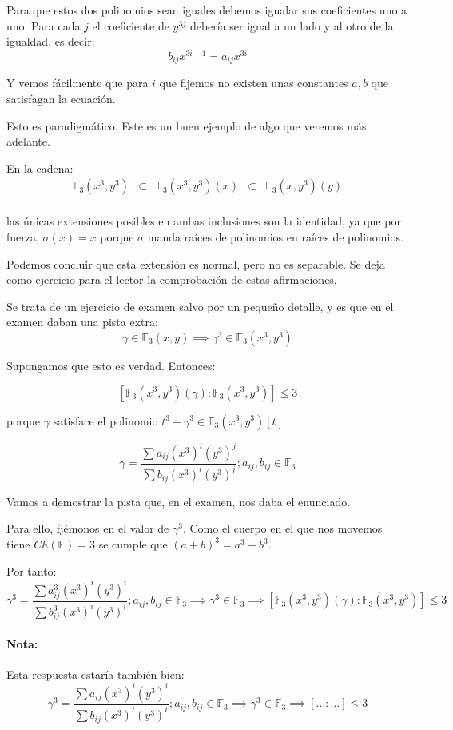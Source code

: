 \begin{problem}[3]
Para que estos dos polinomios sean iguales debemos igualar sus coeficientes uno a uno. Para cada $j$ el coeficiente de $y^{3j}$ debería ser igual a un lado y al otro de la igualdad, es decir:
\[b_{ij}x^{3i+1}=a_{ij}x^{3i}\]

Y vemos fácilmente que para $i$ que fijemos no existen unas constantes $a,b$ que satisfagan la ecuación.

\spart Esto es paradigmático. Este es un buen ejemplo de algo que veremos más adelante.

En la cadena:
$$\begin{array}{ccccc}\mathbb{F}_3(x^3,y^3) &\subset& \mathbb{F}_3(x^3,y^3)(x) &\subset& \mathbb{F}_3(x,y^3)(y)\\
\end{array}$$

las únicas extensiones posibles en ambas inclusiones son la identidad, ya que por fuerza, $σ(x) = x$ porque $σ$ manda raíces de polinomios en raíces de polinomios.

Podemos concluir que esta extensión es normal, pero no es separable. Se deja como ejercicio para el lector la comprobación de estas afirmaciones.

\spart Se trata de un ejercicio de examen salvo por un pequeño detalle, y es que en el examen daban una pista extra:
\[γ∈\mathbb{F}_3(x,y) \implies γ^3 ∈\mathbb{F}_3(x^3,y^3)\]

Supongamos que esto es verdad. Entonces:

\[[\mathbb{F}_3(x^3,y^3)(γ) : \mathbb{F}_3(x^3,y^3)] ≤ 3\]

porque $γ$ satisface el polinomio $t^3 -γ^3 ∈ \mathbb{F}_3(x^3,y^3)[t]$

\[γ = \frac{\sum a_{ij}(x^3)^i(y^3)^j}{\sum b_{ij}(x^3)^i(y^3)^j}; a_{ij},b_{ij} ∈ \mathbb{F}_3\]

Vamos a demostrar la pista que, en el examen, nos daba el enunciado.

Para ello, fjémonos en el valor de $γ^3$. Como el cuerpo en el que nos movemos tiene $Ch(\mathbb{F}) = 3$ se cumple que $(a+b)^{3} = a^3 + b^3$.

Por tanto:
\[γ^3 = \frac{\sum a_{ij}^3(x^3)^i(y^3)^i}{\sum b_{ij}^3(x^3)^i(y^3)^i}; a_{ij},b_{ij} ∈ \mathbb{F}_3 \implies γ^3 ∈ \mathbb{F}_3 \implies [\mathbb{F}_3(x^3,y^3)(γ) : \mathbb{F}_3(x^3,y^3)] ≤ 3\]

\paragraph{Nota:} Esta respuesta estaría también bien:
$$γ^3 = \frac{\sum a_{ij}(x^3)^i(y^3)^i}{\sum b_{ij}(x^3)^i(y^3)^i}; a_{ij},b_{ij} ∈ \mathbb{F}_3 \implies γ^3 ∈ \mathbb{F}_3 \implies [... : ...] ≤ 3$$


\end{problem}
